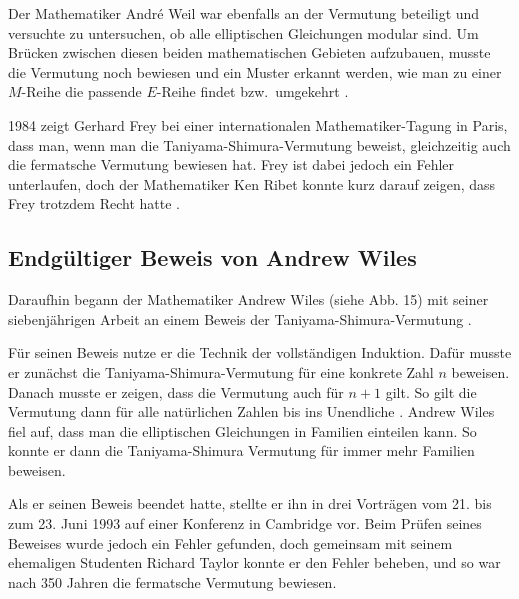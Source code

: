 \documentclass[a4paper,12pt]{article}
\begin{document}
Der Mathematiker André Weil war ebenfalls an der Vermutung beteiligt und versuchte zu untersuchen, ob alle elliptischen Gleichungen modular sind. Um Brücken zwischen diesen beiden mathematischen Gebieten aufzubauen, musste die Vermutung noch bewiesen und ein Muster erkannt werden, wie man zu einer $M$-Reihe die passende $E$-Reihe findet bzw.\ umgekehrt \cite[S. 223]{Buch}. 

1984 zeigt Gerhard Frey bei einer internationalen Mathematiker-Tagung in Paris, dass man, wenn man die Taniyama-Shimura-Vermutung beweist, gleichzeitig auch die fermatsche Vermutung bewiesen hat. Frey ist dabei jedoch ein Fehler unterlaufen, doch der Mathematiker Ken Ribet konnte kurz darauf zeigen, dass Frey trotzdem Recht hatte \cite[S. 228-235]{Buch}.

\subsection{Endgültiger Beweis von Andrew Wiles}

\begin{figwindow}

Daraufhin begann der Mathematiker Andrew Wiles (siehe Abb. 15) mit seiner siebenjährigen Arbeit an einem Beweis der Taniyama-Shimura-Vermutung \cite[S. 237]{Buch}. 

Für seinen Beweis nutze er die Technik der vollständigen Induktion. Dafür musste er zunächst die Taniyama-Shimura-Vermutung für eine konkrete Zahl $n$ beweisen. Danach musste er zeigen, dass die Vermutung auch für $n + 1$ gilt. So gilt die Vermutung dann für alle natürlichen Zahlen bis ins Unendliche \cite[S. 243 f.]{Buch}. 
Andrew Wiles fiel auf, dass man die elliptischen Gleichungen in Familien einteilen kann. So konnte er dann die Taniyama-Shimura Vermutung für immer mehr Familien beweisen. 

Als er seinen Beweis beendet hatte, stellte er ihn in drei Vorträgen vom 21. bis zum 23. Juni 1993 auf einer Konferenz in Cambridge vor. Beim Prüfen seines Beweises wurde jedoch ein Fehler gefunden, doch gemeinsam mit seinem ehemaligen Studenten Richard Taylor konnte er den Fehler beheben, und so war nach 350 Jahren die fermatsche Vermutung bewiesen.

\end{figwindow}
\end{document}
